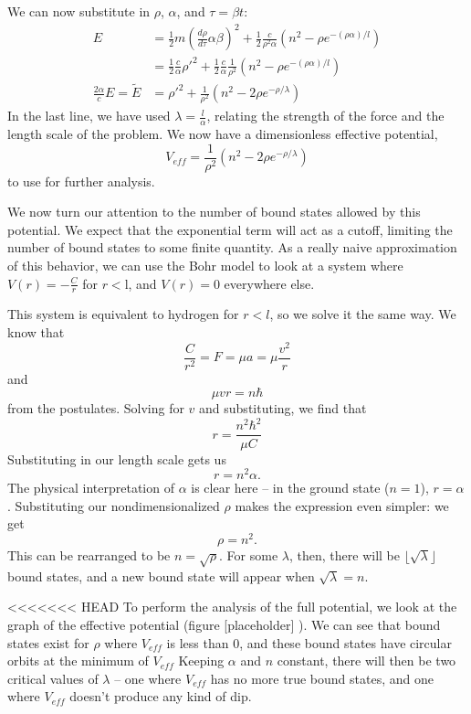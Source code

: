 \documentclass[12pt,twoside]{reedthesis}
\newcommand{\eqn}[1]{\begin{equation}#1\end{equation}}
\begin{document}
We can now substitute in $\rho$, $\alpha$, and $\tau = \beta t$:
\begin{align}
E &= \frac{1}{2}m\left(\frac{d\rho}{d \tau}\alpha \beta\right)^2+\frac{1}{2}\frac{c}{\rho^2 \alpha}(n^2-\rho e^{-(\rho \alpha)/l}) \\
&= \frac{1}{2}\frac{c}{\alpha}\rho'^2 + \frac{1}{2}\frac{c}{\alpha}\frac{1}{\rho^2}(n^2-\rho e^{-(\rho \alpha)/l}) \\
\frac{2\alpha}{c}E = \tilde{E} &= \rho'^2 +\frac{1}{\rho^2}(n^2 - 2\rho e^{-\rho/ \lambda})
\end{align}
In the last line, we have used $\lambda = \frac{l}{\alpha}$, relating the strength of the force and the length scale of the problem. 
We now have a dimensionless effective potential,
\begin{equation}
V_{eff}=\frac{1}{\rho^2}(n^2- 2\rho e^{-\rho/\lambda})
\label{veff}
\end{equation}
to use for further analysis.

We now turn our attention to the number of bound states allowed by this potential. We expect that the exponential term will act as a cutoff, limiting the number of bound states to some finite quantity. As a really naive approximation of this behavior, we can use the Bohr model to look at a system where $V(r) = -\frac{C}{r}$ for $r < $l, and $V(r) = 0$ everywhere else.

This system is equivalent to hydrogen for $r<l$, so we solve it the same way. We know that
\eqn{
\frac{C}{r^2} = F = \mu a = \mu \frac{v^2}{r}
}
and 
\eqn{
\mu v r = n\hbar
}
from the postulates. Solving for $v$ and substituting, we find that
\eqn{
r = \frac{n^2 \hbar^2}{\mu C}
}
Substituting in our length scale gets us 
\eqn{
r = n^2 \alpha \mbox{.}
}
The physical interpretation of $\alpha$ is clear here -- in the ground state ($n = 1$), $r = \alpha$. Substituting our nondimensionalized $\rho$ makes the expression even simpler: we get
\eqn{
\rho = n^2\mbox{.}
}
This can be rearranged to be $n = \sqrt{\rho}$. For some $\lambda$, then, there will be $\lfloor \sqrt{\lambda} \rfloor$ bound states, and a new bound state will appear when $\sqrt{\lambda} = n$.

<<<<<<< HEAD
To perform the analysis of the full potential, we look at the graph of the effective potential (figure [placeholder]%
). 
We can see that bound states exist for $\rho$ where $V_{eff}$ is less than 0, and these bound states have circular orbits at the minimum of $V_{eff}$ Keeping $\alpha$ and $n$ constant, there will then be two critical values of $\lambda$ -- one where $V_{eff}$ has no more true bound states, and one where $V_{eff}$ doesn't produce any kind of dip.
\end{document}
